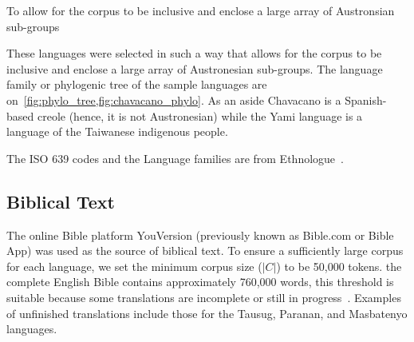 \documentclass{article}
\begin{document}
To allow for the corpus to be inclusive and enclose a large array of
Austronsian sub-groups

These languages were selected in such a way that allows for the corpus to be
inclusive and enclose a large array of Austronesian sub-groups. The language
family or phylogenic tree of the sample languages are
on~\cref{fig:phylo_tree,fig:chavacano_phylo}. As an aside Chavacano is a
Spanish-based creole (hence, it is not Austronesian) while the Yami language is
a language of the Taiwanese indigenous people.~

The ISO 639 codes and the Language families are from Ethnologue~\cite{ESF25}.
\newpage \thispagestyle{empty}  \newpage%

\subsection{Biblical Text}

The online Bible platform YouVersion (previously known as Bible.com or Bible
App) was used as the source of biblical text. To ensure a sufficiently large
corpus for each language, we set the minimum corpus size (\( |C| \)) to be
50,000 tokens. the complete English Bible contains approximately 760,000 words,
this threshold is suitable because some translations are incomplete or still in
progress~\cite{JJS11}. Examples of unfinished translations include those for
the Tausug, Paranan, and Masbatenyo languages.
\end{document}
